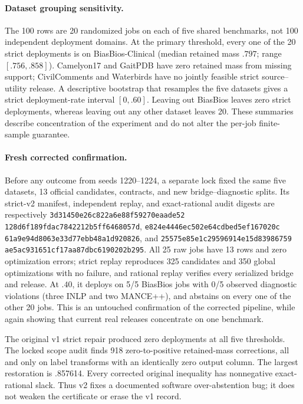 \paragraph{Dataset grouping sensitivity.}
The 100 rows are 20 randomized jobs on each of five shared benchmarks, not 100
independent deployment domains. At the primary threshold, every one of the 20
strict deployments is on BiasBios-Clinical (median retained mass $.797$;
range $[.756,.858]$). Camelyon17 and GaitPDB have zero retained mass from
missing support; CivilComments and Waterbirds have no jointly feasible strict
source--utility release. A descriptive bootstrap that resamples the five
datasets gives a strict deployment-rate interval $[0,.60]$. Leaving out
BiasBios leaves zero strict deployments, whereas leaving out any other dataset
leaves 20. These summaries describe concentration of the experiment and do not
alter the per-job finite-sample guarantee.

\paragraph{Fresh corrected confirmation.}
Before any outcome from seeds 1220--1224, a separate lock fixed the same five
datasets, 13 official candidates, contracts, and new bridge--diagnostic splits.
Its strict-v2 manifest, independent replay, and exact-rational audit digests
are respectively \texttt{3d31450e26c822a6e88f59270eaade52}\allowbreak
\texttt{128d6f189fdac7842212b5ff6468057d},
\texttt{e824e4446ec502e64cdbed5ef167020c}\allowbreak
\texttt{61a9e94d8063e33d77ebb48a1d920826}, and
\texttt{25575e85e1c29596914e15d83986759}\allowbreak
\texttt{ae5ac931651cf17aa87dbc6190202b295}. All 25 raw jobs have 13 rows and
zero optimization errors; strict replay reproduces 325 candidates and 350
global optimizations with no failure, and rational replay verifies every
serialized bridge and release. At $.40$, it deploys on 5/5 BiasBios jobs with
0/5 observed diagnostic violations (three INLP and two MANCE++), and abstains
on every one of the other 20 jobs. This is an untouched confirmation of the
corrected pipeline, while again showing that current real releases concentrate
on one benchmark.

The original v1 strict repair produced zero deployments at all five thresholds.
The locked scope audit finds 918 zero-to-positive retained-mass corrections,
all and only on label transforms with an identically zero output column. The
largest restoration is .857614. Every corrected original inequality has
nonnegative exact-rational slack. Thus v2 fixes a documented software
over-abstention bug; it does not weaken the certificate or erase the v1 record.
